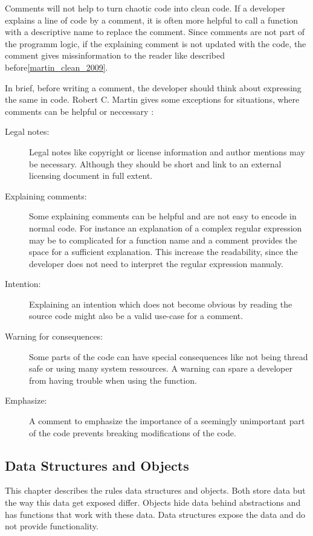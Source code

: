Comments will not help to turn chaotic code into clean code. If a developer explains a line of code by a comment, it is often more helpful to call a function with a descriptive name to replace the comment. Since comments are not part of the programm logic, if the explaining comment is not updated with the code, the comment gives missinformation to the reader like described before\ref{martin_clean_2009}.

In brief, before writing a comment, the developer should think about expressing the same in code. Robert C. Martin gives some exceptions for situations, where comments can be helpful or neccessary \cite{martin_clean_2009}:

\begin{description}
    \item[Legal notes:] Legal notes like copyright or license information and author mentions may be necessary. Although they should be short and link to an external licensing document in full extent.
    \item[Explaining comments:] Some explaining comments can be helpful and are not easy to encode in normal code. For instance an explanation of a complex regular expression may be to complicated for a function name and a comment provides the space for a sufficient explanation. This increase the readability, since the developer does not need to interpret the regular expression manualy.
    \item[Intention:] Explaining an intention which does not become obvious by reading the source code might also be a valid use-case for a comment. 
    \item[Warning for consequences:] Some parts of the code can have special consequences like not being thread safe or using many system ressources. A warning can spare a developer from having trouble when using the function.
    \item[Emphasize:] A comment to emphasize the importance of a seemingly unimportant part of the code prevents breaking modifications of the code. 
\end{description}

\subsection{Data Structures and Objects}
This chapter describes the rules data structures and objects. Both store data but the way this data get exposed differ. Objects hide data behind abstractions and has functions that work with these data. Data structures expose the data and do not provide functionality. 

